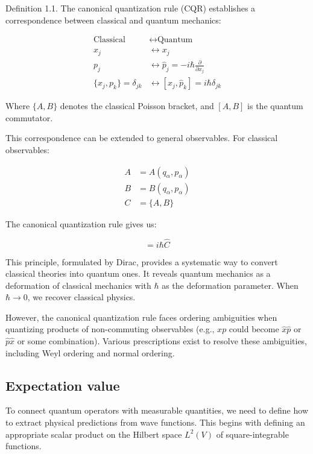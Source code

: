 Definition 1.1. The canonical quantization rule (CQR) establishes a correspondence between classical and quantum mechanics:

\begin{align}
\text{Classical} &\longleftrightarrow \text{Quantum} \\
x_j &\longleftrightarrow x_j \\
p_j &\longleftrightarrow \hat{p}_j = -i\hbar\frac{\partial}{\partial x_j}  \\
\{x_j, p_k\} = \delta_{jk} &\longleftrightarrow [x_j, \hat{p}_k] = i\hbar\delta_{jk}
\end{align}

Where $\{A,B\}$ denotes the classical Poisson bracket, and $[A,B]$ is the quantum commutator.

This correspondence can be extended to general observables. For classical observables:

\begin{align}
A &= A(q_\alpha, p_\alpha) \\
B &= B(q_\alpha, p_\alpha)  \\
C &= \{A, B\}
\end{align}

The canonical quantization rule gives us:

\begin{equation}
[\hat{A}, \hat{B}] = i\hbar\hat{C}
\end{equation}

This principle, formulated by Dirac, provides a systematic way to convert classical theories into quantum ones. It reveals quantum mechanics as a deformation of classical mechanics with $\hbar$ as the deformation parameter. When $\hbar \to 0$, we recover classical physics.

However, the canonical quantization rule faces ordering ambiguities when quantizing products of non-commuting observables (e.g., $xp$ could become $\hat{x}\hat{p}$ or $\hat{p}\hat{x}$ or some combination). Various prescriptions exist to resolve these ambiguities, including Weyl ordering and normal ordering.

\subsection{Expectation value}

To connect quantum operators with measurable quantities, we need to define how to extract physical predictions from wave functions. This begins with defining an appropriate scalar product on the Hilbert space $L^2(V)$ of square-integrable functions.


